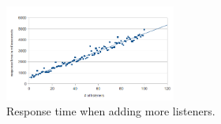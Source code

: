 \begin{figure}[h]
	\centering
	\includegraphics[width=0.5\textwidth]{add_listeners_response_time.png}
	\caption{Response time when adding more listeners.}
	\label{fig:addListenersResponseTime}
\end{figure}
